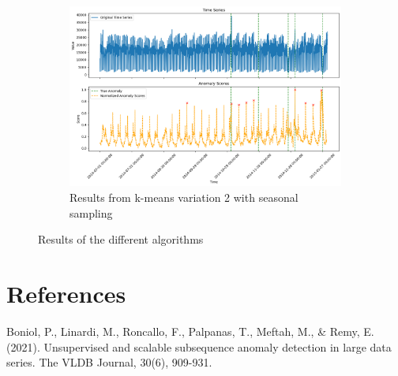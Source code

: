 \documentclass[11pt]{article}
\begin{document}
\begin{figure}[h]
    \begin{subfigure}[b]{0.4\textwidth}
        \includegraphics[width=\textwidth]{algo4.png}
        \caption{Results from k-means variation 2 with seasonal sampling}
        \label{fig:algo3}
    \end{subfigure}
    \caption{Results of the different algorithms}
    \label{fig:results}
\end{figure}



\section{References}
\label{ref1} Boniol, P., Linardi, M., Roncallo, F., Palpanas, T., Meftah, M., \& Remy, E. (2021). Unsupervised and scalable subsequence anomaly detection in large data series. The VLDB Journal, 30(6), 909-931.
\end{document}
